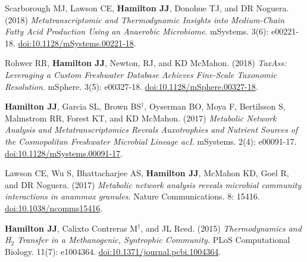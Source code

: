 \documentclass[letterpaper,10pt]{article}
\begin{document}
\begin{etaremune}[itemsep=-2pt]
	\item Scarborough MJ, Lawson CE, \textbf{Hamilton JJ}, Donohue TJ, and DR Noguera. (2018) \emph{Metatranscriptomic and Thermodynamic Insights into Medium-Chain Fatty Acid Production Using an Anaerobic Microbiome}. mSystems. 3(6): e00221-18. \href{https://doi.org/10.1128/mSystems.00221-18}{doi:10.1128/mSystems.00221-18}.
	\item Rohwer RR, \textbf{Hamilton JJ}, Newton, RJ, and KD McMahon. (2018) \emph{TaxAss: Leveraging a Custom Freshwater Database Achieves Fine-Scale Taxonomic Resolution}. mSphere. 3(5): e00327-18. \href{https://doi.org/10.1128/mSphere.00327-18}{doi:10.1128/mSphere.00327-18}.
	\item \textbf{Hamilton JJ}, Garcia SL, Brown BS$^\dagger$, Oyserman BO, Moya F, Bertilsson S, Malmstrom RR, Forest KT, and KD McMahon. (2017) \emph{Metabolic Network Analysis and Metatranscriptomics Reveals Auxotrophies and Nutrient Sources of the Cosmopolitan Freshwater Microbial Lineage acI}. mSystems. 2(4): e00091-17. \href{https://doi.org/10.1128/mSystems.00091-17}{doi:10.1128/mSystems.00091-17}.
	\item Lawson CE, Wu S, Bhattacharjee AS, \textbf{Hamilton JJ}, McMahon KD, Goel R, and DR Noguera. (2017) \emph{Metabolic network analysis reveals microbial community interactions in anammox granules}. Nature Communications. 8: 15416. \href{https://www.nature.com/articles/ncomms15416}{doi:10.1038/ncomms15416}.
	\item \textbf{Hamilton JJ}, Calixto Contreras M$^\dagger$, and JL Reed. (2015) \emph{Thermodynamics and H$_2$ Transfer in a Methanogenic, Syntrophic Community.} PLoS Computational Biology. 11(7): e1004364. \href{http://journals.plos.org/ploscompbiol/article?id=10.1371/journal.pcbi.1004364}{doi:10.1371/journal.pcbi.1004364}.

\end{etaremune}
\end{document}
